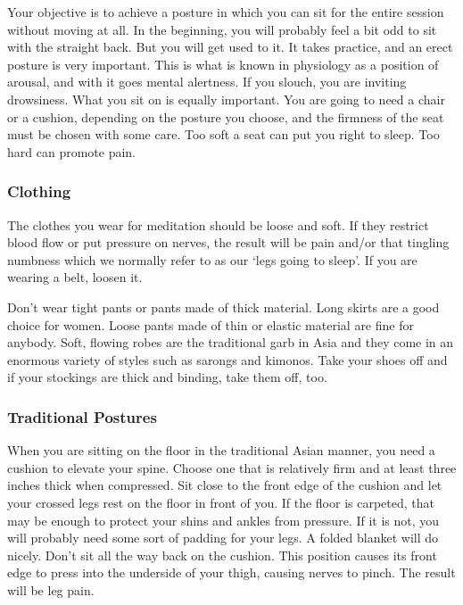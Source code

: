 Your objective is to achieve a posture in which you can sit for the entire
session without moving at all. In the beginning, you will probably feel a bit
odd to sit with the straight back. But you will get used to it. It takes
practice, and an erect posture is very important. This is what is known in
physiology as a position of arousal, and with it goes mental alertness. If you
slouch, you are inviting drowsiness. What you sit on is equally important. You
are going to need a chair or a cushion, depending on the posture you choose, and
the firmness of the seat must be chosen with some care. Too soft a seat can put
you right to sleep. Too hard can promote pain.

\subsubsection*{Clothing}
 The clothes you wear for meditation should be loose and soft. If they
restrict blood flow or put pressure on nerves, the result will be pain and/or
that tingling numbness which we normally refer to as our `legs going to sleep'.
If you are wearing a belt, loosen it.

Don't wear tight pants or pants made of thick material. Long skirts are a good
choice for women. Loose pants made of thin or elastic material are fine for
anybody. Soft, flowing robes are the traditional garb in Asia and they come in
an enormous variety of styles such as sarongs and kimonos. Take your shoes off
and if your stockings are thick and binding, take them off, too.

\subsubsection*{Traditional Postures}
When you are sitting on the floor in the traditional Asian manner, you need a cushion to elevate your spine. Choose one that is
relatively firm and at least three inches thick when compressed. Sit close to the front edge of the cushion and let your crossed legs
rest on the floor in front of you. If the floor is carpeted, that may be enough to protect your shins and ankles from pressure. If it is
not, you will probably need some sort of padding for your legs. A folded blanket will do nicely. Don't sit all the way back on the
cushion. This position causes its front edge to press into the underside of your thigh, causing nerves to pinch. The result will be
leg pain.

